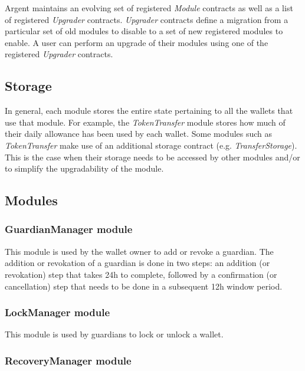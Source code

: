 \documentclass[12pt]{article}
\begin{document}
Argent maintains an evolving set of registered \emph{Module} contracts as well as a list of registered \emph{Upgrader} contracts. \emph{Upgrader} contracts define a migration from a particular set of old modules to disable to a set of new registered modules to enable. A user can perform an upgrade of their modules using one of the registered \emph{Upgrader} contracts.



\subsection{Storage}
\label{sec:storage}
In general, each module stores the entire state pertaining to all the wallets that use that module. For example, the \emph{TokenTransfer} module stores how much of their daily allowance has been used by each wallet. Some modules such as \emph{TokenTransfer} make use of an additional storage contract (e.g. \emph{TransferStorage}). This is the case when their storage needs to be accessed by other modules and/or to simplify the upgradability of the module.

\subsection{Modules}

\subsubsection{GuardianManager module}

This module is used by the wallet owner to add or revoke a guardian. The addition or revokation of a guardian is done in two steps: an addition (or revokation) step that takes 24h to complete, followed by a confirmation (or cancellation) step that needs to be done in a subsequent 12h window period.

\subsubsection{LockManager module}

This module is used by guardians to lock or unlock a wallet.

\subsubsection{RecoveryManager module}
\end{document}
